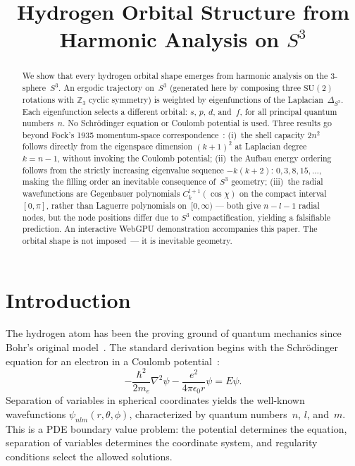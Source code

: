 \documentclass[12pt, a4paper]{article}
\title{Hydrogen Orbital Structure from Harmonic Analysis on $S^3$}
\author{}
\date{}
\theoremstyle{definition}
\theoremstyle{remark}
\newcommand{\Sthree}{S^3}
\newcommand{\SU}{\mathrm{SU}(2)}
\newcommand{\Z}{\mathbb{Z}}
\newcommand{\lap}{\Delta_{\Sthree}}
\begin{document}
\maketitle

\begin{abstract}
We show that every hydrogen orbital shape emerges from harmonic analysis
on the 3-sphere~$\Sthree$. An ergodic trajectory on~$\Sthree$ (generated
here by composing three $\SU$ rotations with $\Z_3$ cyclic symmetry) is
weighted by eigenfunctions of the Laplacian~$\lap$. Each eigenfunction
selects a different orbital: $s$, $p$, $d$, and~$f$, for all principal
quantum numbers~$n$. No Schr\"odinger equation or Coulomb potential is used.
Three results go beyond Fock's 1935 momentum-space
correspondence~\cite{fock1935}: (i)~the shell capacity $2n^2$ follows
directly from the eigenspace dimension $(k{+}1)^2$ at Laplacian degree
$k = n{-}1$, without invoking the Coulomb potential; (ii)~the Aufbau energy
ordering follows from the strictly increasing eigenvalue sequence
$-k(k{+}2)$: $0, 3, 8, 15, \ldots$, making the filling order an inevitable
consequence of~$\Sthree$ geometry; (iii)~the radial wavefunctions are
Gegenbauer polynomials $C_k^{l+1}(\cos\chi)$ on the compact
interval~$[0,\pi]$, rather than Laguerre polynomials on~$[0,\infty)$ ---
both give $n{-}l{-}1$ radial nodes, but the node positions differ due to
$\Sthree$ compactification, yielding a falsifiable prediction. An interactive
WebGPU demonstration accompanies this paper. The orbital shape is not
imposed~--- it is inevitable geometry.
\end{abstract}

\section{Introduction}
\label{sec:intro}

The hydrogen atom has been the proving ground of quantum mechanics since
Bohr's original model~\cite{bohr1913}. The standard derivation begins with
the Schr\"odinger equation for an electron in a Coulomb
potential~\cite{schrodinger1926,griffiths2018}:
\begin{equation}
  -\frac{\hbar^2}{2m_e}\nabla^2\psi - \frac{e^2}{4\pi\epsilon_0 r}\psi
  = E\psi.
  \label{eq:schrodinger}
\end{equation}
Separation of variables in spherical coordinates yields the well-known
wavefunctions $\psi_{nlm}(r,\theta,\phi)$, characterized by quantum
numbers~$n$, $l$, and~$m$. This is a PDE boundary value problem: the
potential determines the equation, separation of variables determines the
coordinate system, and regularity conditions select the allowed solutions.
\end{document}
